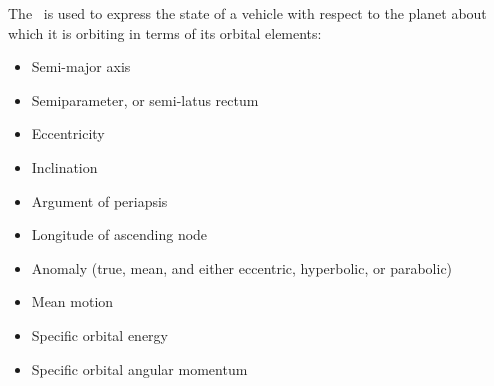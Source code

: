 %
%
% 
%



The \OrbElemDesc\ is used to express the state of a vehicle with respect to the planet about which it is orbiting in terms of its orbital elements:
\begin{itemize}
 \item {Semi-major axis}
\item {Semiparameter, or semi-latus rectum}
\item {Eccentricity}
\item {Inclination}
\item {Argument of periapsis}
\item {Longitude of ascending node}
\item {Anomaly (true, mean, and either eccentric, hyperbolic, or parabolic)}
\item {Mean motion}
\item {Specific orbital energy}
\item {Specific orbital angular momentum}
\end{itemize}














